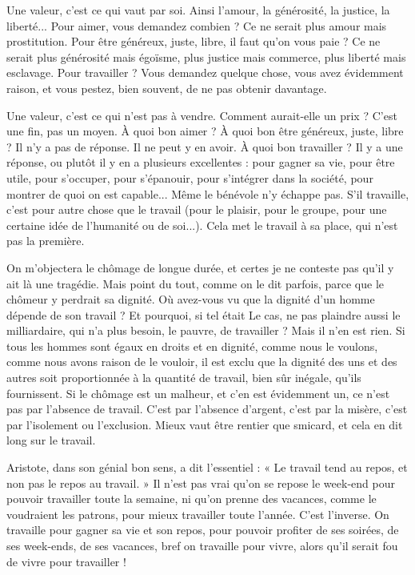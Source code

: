 Une valeur, c’est ce qui vaut par soi. Ainsi l’amour, la générosité, la justice,
la liberté... Pour aimer, vous demandez combien ? Ce ne serait plus amour
mais prostitution. Pour être généreux, juste, libre, il faut qu’on vous paie ? Ce
ne serait plus générosité mais égoïsme, plus justice mais commerce, plus liberté
mais esclavage. Pour travailler ? Vous demandez quelque chose, vous avez évidemment
raison, et vous pestez, bien souvent, de ne pas obtenir davantage.

Une valeur, c’est ce qui n’est pas à vendre. Comment aurait-elle un prix ?
C’est une fin, pas un moyen. À quoi bon aimer ? À quoi bon être généreux,
juste, libre ? Il n’y a pas de réponse. Il ne peut y en avoir. À quoi bon travailler ?
Il y a une réponse, ou plutôt il y en a plusieurs excellentes : pour gagner sa vie,
pour être utile, pour s'occuper, pour s’épanouir, pour s'intégrer dans la société,
pour montrer de quoi on est capable... Même le bénévole n’y échappe pas. S’il
travaille, c’est pour autre chose que le travail (pour le plaisir, pour le groupe,
pour une certaine idée de l'humanité ou de soi...). Cela met le travail à sa
place, qui n’est pas la première.

On m'objectera le chômage de longue durée, et certes je ne conteste pas
qu'il y ait là une tragédie. Mais point du tout, comme on le dit parfois, parce
que le chômeur y perdrait sa dignité. Où avez-vous vu que la dignité d’un
homme dépende de son travail ? Et pourquoi, si tel était Le cas, ne pas plaindre
aussi le milliardaire, qui n’a plus besoin, le pauvre, de travailler ? Mais il n’en
est rien. Si tous les hommes sont égaux en droits et en dignité, comme nous le
voulons, comme nous avons raison de le vouloir, il est exclu que la dignité des
uns et des autres soit proportionnée à la quantité de travail, bien sûr inégale,
qu’ils fournissent. Si le chômage est un malheur, et c’en est évidemment un, ce
n'est pas par l'absence de travail. C’est par l’absence d’argent, c’est par la
misère, c’est par l'isolement ou l'exclusion. Mieux vaut être rentier que smicard,
et cela en dit long sur le travail.

Aristote, dans son génial bon sens, a dit l’essentiel : « Le travail tend au
repos, et non pas le repos au travail. » Il n’est pas vrai qu’on se repose le week-end
pour pouvoir travailler toute la semaine, ni qu’on prenne des vacances,
comme le voudraient les patrons, pour mieux travailler toute l’année. C’est
l'inverse. On travaille pour gagner sa vie et son repos, pour pouvoir profiter de
ses soirées, de ses week-ends, de ses vacances, bref on travaille pour vivre, alors
qu’il serait fou de vivre pour travailler !

